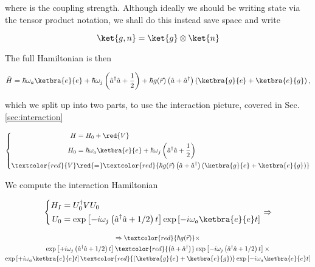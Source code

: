 \noindent where  is the coupling strength. Although ideally we should be writing state via the tensor product notation, we shall do this instead save space and write

\begin{equation}
\ket{g,n}=\ket{g}\otimes\ket{n}
\end{equation}

\noindent The full Hamiltonian is then

\begin{equation}
\hat{H} = \hbar\omega_a\ketbra{e}{e} + \hbar\omega_j\left(\hat{a}^\dagger\hat{a}+\frac{1}{2}\right) + {\hbar g(\vec{r})}\left(\hat{a}+\hat{a}^\dagger\right)\left(\ketbra{g}{e}+\ketbra{e}{g}\right),
\end{equation}

\noindent which we split up into two parts, to use the interaction picture, covered in Sec.\ref{sec:interaction}

\begin{equation}
\left\lbrace 
\begin{aligned}
H & = H_0+\red{V}\\
H_0 & = \hbar\omega_a\ketbra{e}{e} + \hbar\omega_j\left(\hat{a}^\dagger\hat{a}+\frac{1}{2}\right)\\
\textcolor{red}{V} & \red{=} \textcolor{red}{{\hbar g(\vec{r})}\left(\hat{a}+\hat{a}^\dagger\right)\left(\ketbra{g}{e}+\ketbra{e}{g}\right)}
\end{aligned}\right.
\label{eqn:lightAtomHamiltonians}
\end{equation}

\noindent We compute the interaction Hamiltonian

\begin{equation}
\left\lbrace
\begin{aligned}
H_I & = U_0^\dagger V U_0 \\
U_0 & = \exp\left[-i\omega_j\left(\hat{a}^\dagger\hat{a}+{1}/{2}\right)t\right]\exp\left[-i\omega_a\ketbra{e}{e}t\right]
\end{aligned}\right. \Rightarrow
\end{equation}

\begin{multline}
\Rightarrow \textcolor{red}{\hbar g(\vec{r})} \times \\
\exp\left[+i\omega_j\left(\hat{a}^\dagger\hat{a}+{1}/{2}\right)t\right]\textcolor{red}{\left(\hat{a}+\hat{a}^\dagger\right)}\exp\left[-i\omega_j\left(\hat{a}^\dagger\hat{a}+{1}/{2}\right)t\right] \times\\
\exp\left[+i\omega_a\ketbra{e}{e}t\right]\textcolor{red}{\left(\ketbra{g}{e}+\ketbra{e}{g}\right)}\exp\left[-i\omega_a\ketbra{e}{e}t\right]
\end{multline}

